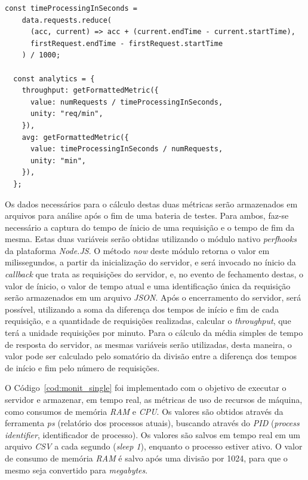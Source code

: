 \documentclass[12pt]{article}
\begin{document}
\begin{lstlisting}[caption={Implementação do cálculo das métricas \textit{throughput} e média do tempo de resposta}, label=cod:analytics]
	const timeProcessingInSeconds =
    data.requests.reduce(
      (acc, current) => acc + (current.endTime - current.startTime),
      firstRequest.endTime - firstRequest.startTime
    ) / 1000;

  const analytics = {
    throughput: getFormattedMetric({
      value: numRequests / timeProcessingInSeconds,
      unity: "req/min",
    }),
    avg: getFormattedMetric({
      value: timeProcessingInSeconds / numRequests,
      unity: "min",
    }),
  };
\end{lstlisting}

Os dados necessários para o cálculo destas duas métricas serão armazenados em arquivos para análise após o fim de uma 
bateria de testes. Para ambos, faz-se necessário a captura do tempo de ínicio de uma requisição
e o tempo de fim da mesma. Estas duas variáveis serão obtidas utilizando
o módulo nativo \textit{perf\textunderscore hooks} da plataforma \textit{Node.JS}. 
O método \textit{now} deste módulo retorna o valor em milissegundos, a partir da inicialização
do servidor, e será invocado no ínicio da 
\textit{callback} que trata as requisições do servidor, e, no evento de 
fechamento destas, o valor de ínicio, o valor de tempo atual e
uma identificação única da requisição serão armazenados em um arquivo \textit{JSON}. Após o encerramento do servidor, será 
possível, utilizando a soma da diferença dos tempos de início e fim de cada requisição, e a quantidade de requisições realizadas, calcular o 
\textit{throughput}, que terá a unidade requisições por minuto. Para o cálculo da média simples de tempo de resposta do servidor, 
as mesmas variáveis serão utilizadas, desta maneira, o valor pode ser calculado pelo somatório da 
divisão entre a diferença dos tempos de início e fim pelo número de requisições.

O Código~\ref{cod:monit_single} foi implementado com o objetivo de executar o servidor e armazenar, em tempo real,
as métricas de uso de recursos de máquina, como consumos de memória \textit{RAM} e \textit{CPU}. Os valores 
são obtidos através da ferramenta \textit{ps} (relatório dos processos atuais), buscando através do 
\textit{PID} (\textit{process identifier}, identificador de processo). Os valores são salvos em tempo real em um arquivo 
\textit{CSV} a cada segundo (\textit{sleep 1}), enquanto o processo estiver ativo. 
O valor de consumo de memória \textit{RAM} é salvo após uma divisão por 1024, para que o mesmo 
seja convertido para \textit{megabytes}. 
\end{document}

